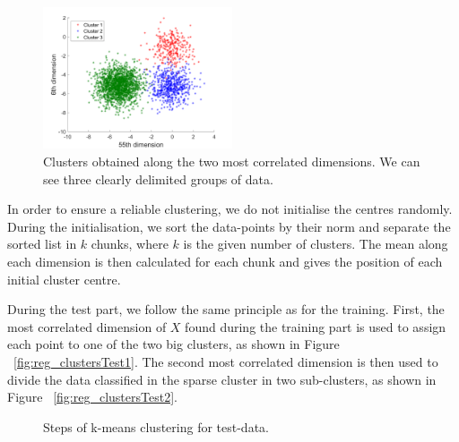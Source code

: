\documentclass{article} %
\begin{document}
\begin{figure}[!h] %
	\center
	\includegraphics[width=2.2in]{figures/clusters_train.png}
	\caption{Clusters obtained along the two most correlated dimensions. We can see three clearly delimited groups of data.}
	\label{fig:reg_clustersTrain}
\end{figure}

In order to ensure a reliable clustering, we do not initialise the centres randomly. During the initialisation, we sort the data-points by their norm and separate the sorted list in $k$ chunks, where $k$ is the given number of clusters. The mean along each dimension is then calculated for each chunk and gives the position of each initial cluster centre.

During the test part, we follow the same principle as for the training. First, the most correlated dimension of $X$ found during the training part is used to assign each point to one of the two big clusters, as shown in Figure ~\ref{fig:reg_clustersTest1}. The second most correlated dimension is then used to divide the data classified in the sparse cluster in two sub-clusters, as shown in Figure ~\ref{fig:reg_clustersTest2}.

\begin{figure}[!h] %
	\center
	\hfill
	\caption{Steps of k-means clustering for test-data.}
	\label{fig:reg_clustersTest}
\end{figure}
\end{document}
